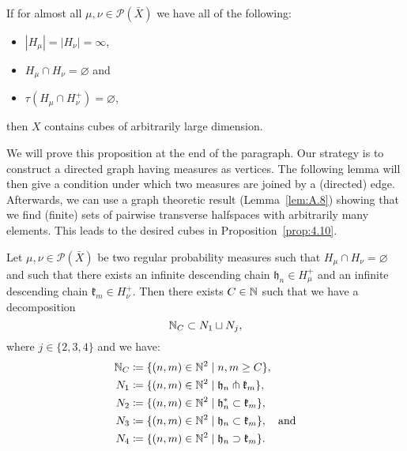 \begin{prop}[{\cite[Proposition~4.10]{MR3509968}}]
  \label{prop:4.10}
  If for almost all \(\mu, \nu \in \mathcal{P}(\bar X)\) we have all of the following:
  \begin{itemize}
  \item \(|H_\mu| = |H_\nu| = \infty\),
  \item \(H_\mu \cap H_\nu = \varnothing\) and
  \item \(\tau(H_\mu \cap H_\nu^+) = \varnothing\),
  \end{itemize}
  then \(X\) contains cubes of arbitrarily large dimension.
\end{prop}

We will prove this proposition at the end of the paragraph. Our strategy is to construct a directed graph having measures as vertices. The following lemma will then give a condition under which two measures are joined by a (directed) edge. Afterwards, we can use a graph theoretic result (Lemma~\ref{lem:A.8}) showing that we find (finite) sets of pairwise transverse halfspaces with arbitrarily many elements. This leads to the desired cubes in Proposition~\ref{prop:4.10}.


\begin{lemma}
  \label{lem:sep-n}
  Let \(\mu, \nu \in \mathcal{P}(\bar X)\) be two regular probability measures such that \(H_\mu \cap H_\nu = \varnothing\) and such that there exists an infinite descending chain \(\mathfrak{h}_n\in H_\mu^+\) and an infinite descending chain \(\mathfrak{k}_m \in H_\nu^+\). Then there exists \(C \in \mathbb{N}\) such that we have a decomposition
  \[
    \mathbb{N}_C \subset N_1 \sqcup N_j,
  \]
  where \(j \in \{2,3,4\}\) and  we have:
  \begin{align*}
    \mathbb{N}_C & \coloneqq \{(n,m) \in \mathbb{N}^2 \mid n,m \geq C\},\\
    N_1 & \coloneqq \{(n,m) \in \mathbb{N}^2 \mid \mathfrak{h}_n \pitchfork \mathfrak{k}_m\},\\
    N_2 & \coloneqq \{(n,m) \in \mathbb{N}^2 \mid \mathfrak{h}_n^\ast \subset \mathfrak{k}_m\},\\
    N_3 & \coloneqq \{(n,m) \in \mathbb{N}^2 \mid \mathfrak{h}_n \subset \mathfrak{k}_m\},\quad \text{and}\\
    N_4 & \coloneqq \{(n,m) \in \mathbb{N}^2 \mid \mathfrak{h}_n \supset \mathfrak{k}_m\}.
  \end{align*}
\end{lemma}

